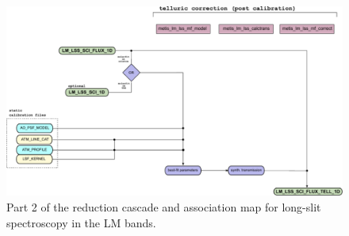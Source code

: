 \begin{landscape}
\begin{figure}[ht]
  \centering
  \includegraphics{figures/LM_LSS_pipeline_wf_draft_latest_part_2_v0.84.pdf}
  \caption[Reduction cascade and association map for LM long-slit
  spectroscopy]{Part 2 of the reduction cascade and association map for long-slit
    spectroscopy in the LM bands.}
  \label{Fig:LMLssAssomap2}
\end{figure}
\end{landscape}




